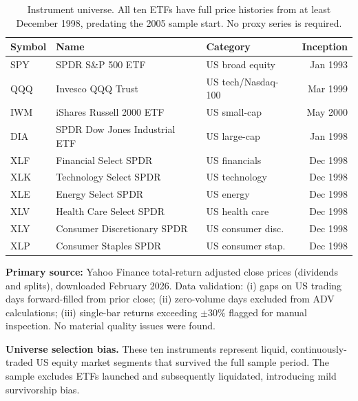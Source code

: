 \documentclass[12pt]{article}
\begin{document}
\begin{table}[H]
\centering
\caption{Instrument universe. All ten ETFs have full price histories
from at least December 1998, predating the 2005 sample start.
No proxy series is required.}
\label{tab:universe}
\small
\begin{tabular}{lllr}
\toprule
Symbol & Name & Category & Inception \\
\midrule
SPY & SPDR S\&P 500 ETF             & US broad equity    & Jan 1993 \\
QQQ & Invesco QQQ Trust              & US tech/Nasdaq-100 & Mar 1999 \\
IWM & iShares Russell 2000 ETF       & US small-cap       & May 2000 \\
DIA & SPDR Dow Jones Industrial ETF  & US large-cap       & Jan 1998 \\
XLF & Financial Select SPDR          & US financials      & Dec 1998 \\
XLK & Technology Select SPDR         & US technology      & Dec 1998 \\
XLE & Energy Select SPDR             & US energy          & Dec 1998 \\
XLV & Health Care Select SPDR        & US health care     & Dec 1998 \\
XLY & Consumer Discretionary SPDR    & US consumer disc.  & Dec 1998 \\
XLP & Consumer Staples SPDR          & US consumer stap.  & Dec 1998 \\
\bottomrule
\end{tabular}
\end{table}

\textbf{Primary source:} Yahoo Finance total-return adjusted close
prices (dividends and splits), downloaded February 2026. Data
validation: (i) gaps on US trading days forward-filled from prior
close; (ii) zero-volume days excluded from ADV calculations;
(iii) single-bar returns exceeding $\pm 30\%$ flagged for manual
inspection. No material quality issues were found.

\textbf{Universe selection bias.} These ten instruments represent
liquid, continuously-traded US equity market segments that survived
the full sample period. The sample excludes ETFs launched and
subsequently liquidated, introducing mild survivorship bias.
\end{document}
